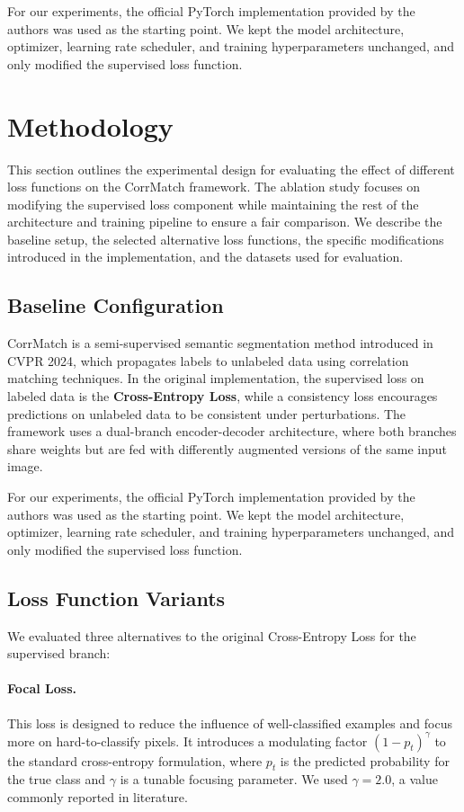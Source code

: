 \documentclass[10pt,twocolumn,letterpaper]{article}
\begin{document}
For our experiments, the official PyTorch implementation provided by the authors \cite{sun2024corrmatch} was used as the starting point. We kept the model architecture, optimizer, learning rate scheduler, and training hyperparameters unchanged, and only modified the supervised loss function.

\section{Methodology}

This section outlines the experimental design for evaluating the effect of different loss functions on the CorrMatch framework. The ablation study focuses on modifying the supervised loss component while maintaining the rest of the architecture and training pipeline to ensure a fair comparison. We describe the baseline setup, the selected alternative loss functions, the specific modifications introduced in the implementation, and the datasets used for evaluation.

\subsection{Baseline Configuration}

CorrMatch is a semi-supervised semantic segmentation method introduced in CVPR 2024, which propagates labels to unlabeled data using correlation matching techniques. In the original implementation, the supervised loss on labeled data is the \textbf{Cross-Entropy Loss}, while a consistency loss encourages predictions on unlabeled data to be consistent under perturbations. The framework uses a dual-branch encoder-decoder architecture, where both branches share weights but are fed with differently augmented versions of the same input image.

For our experiments, the official PyTorch implementation provided by the authors was used as the starting point. We kept the model architecture, optimizer, learning rate scheduler, and training hyperparameters unchanged, and only modified the supervised loss function.

\subsection{Loss Function Variants}

We evaluated three alternatives to the original Cross-Entropy Loss for the supervised branch:

\paragraph{Focal Loss.} This loss is designed to reduce the influence of well-classified examples and focus more on hard-to-classify pixels. It introduces a modulating factor \( (1 - p_t)^\gamma \) to the standard cross-entropy formulation, where \( p_t \) is the predicted probability for the true class and \( \gamma \) is a tunable focusing parameter. We used \( \gamma = 2.0 \), a value commonly reported in literature.
\end{document}
